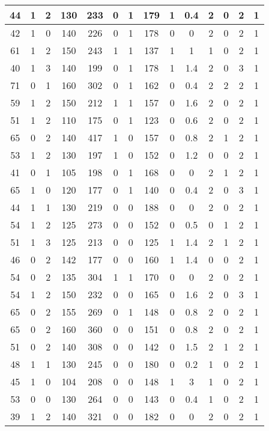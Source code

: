 \documentclass{article}
\begin{document}
\begin{longtable}{|c|c|c|c|c|c|c|c|c|c|c|c|c|c|}
\hline
44 & 1 & 2 & 130 & 233 & 0 & 1 & 179 & 1 & 0.4 & 2 & 0 & 2 & 1\\
\hline
42 & 1 & 0 & 140 & 226 & 0 & 1 & 178 & 0 & 0 & 2 & 0 & 2 & 1\\
\hline
61 & 1 & 2 & 150 & 243 & 1 & 1 & 137 & 1 & 1 & 1 & 0 & 2 & 1\\
\hline
40 & 1 & 3 & 140 & 199 & 0 & 1 & 178 & 1 & 1.4 & 2 & 0 & 3 & 1\\
\hline
71 & 0 & 1 & 160 & 302 & 0 & 1 & 162 & 0 & 0.4 & 2 & 2 & 2 & 1\\
\hline
59 & 1 & 2 & 150 & 212 & 1 & 1 & 157 & 0 & 1.6 & 2 & 0 & 2 & 1\\
\hline
51 & 1 & 2 & 110 & 175 & 0 & 1 & 123 & 0 & 0.6 & 2 & 0 & 2 & 1\\
\hline
65 & 0 & 2 & 140 & 417 & 1 & 0 & 157 & 0 & 0.8 & 2 & 1 & 2 & 1\\
\hline
53 & 1 & 2 & 130 & 197 & 1 & 0 & 152 & 0 & 1.2 & 0 & 0 & 2 & 1\\
\hline
41 & 0 & 1 & 105 & 198 & 0 & 1 & 168 & 0 & 0 & 2 & 1 & 2 & 1\\
\hline
65 & 1 & 0 & 120 & 177 & 0 & 1 & 140 & 0 & 0.4 & 2 & 0 & 3 & 1\\
\hline
44 & 1 & 1 & 130 & 219 & 0 & 0 & 188 & 0 & 0 & 2 & 0 & 2 & 1\\
\hline
54 & 1 & 2 & 125 & 273 & 0 & 0 & 152 & 0 & 0.5 & 0 & 1 & 2 & 1\\
\hline
51 & 1 & 3 & 125 & 213 & 0 & 0 & 125 & 1 & 1.4 & 2 & 1 & 2 & 1\\
\hline
46 & 0 & 2 & 142 & 177 & 0 & 0 & 160 & 1 & 1.4 & 0 & 0 & 2 & 1\\
\hline
54 & 0 & 2 & 135 & 304 & 1 & 1 & 170 & 0 & 0 & 2 & 0 & 2 & 1\\
\hline
54 & 1 & 2 & 150 & 232 & 0 & 0 & 165 & 0 & 1.6 & 2 & 0 & 3 & 1\\
\hline
65 & 0 & 2 & 155 & 269 & 0 & 1 & 148 & 0 & 0.8 & 2 & 0 & 2 & 1\\
\hline
65 & 0 & 2 & 160 & 360 & 0 & 0 & 151 & 0 & 0.8 & 2 & 0 & 2 & 1\\
\hline
51 & 0 & 2 & 140 & 308 & 0 & 0 & 142 & 0 & 1.5 & 2 & 1 & 2 & 1\\
\hline
48 & 1 & 1 & 130 & 245 & 0 & 0 & 180 & 0 & 0.2 & 1 & 0 & 2 & 1\\
\hline
45 & 1 & 0 & 104 & 208 & 0 & 0 & 148 & 1 & 3 & 1 & 0 & 2 & 1\\
\hline
53 & 0 & 0 & 130 & 264 & 0 & 0 & 143 & 0 & 0.4 & 1 & 0 & 2 & 1\\
\hline
39 & 1 & 2 & 140 & 321 & 0 & 0 & 182 & 0 & 0 & 2 & 0 & 2 & 1\\

\end{longtable}
\end{document}
